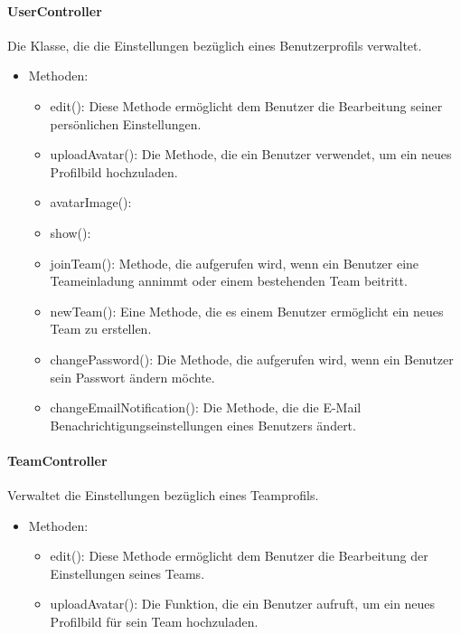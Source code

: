 	\paragraph{UserController}Die Klasse, die die Einstellungen bez\"uglich eines Benutzerprofils verwaltet.
		\begin{itemize}
			\item Methoden:
			\begin{itemize}
				\item edit(): Diese Methode erm\"oglicht dem Benutzer die Bearbeitung seiner pers\"onlichen Einstellungen.
				\item uploadAvatar(): Die Methode, die ein Benutzer verwendet, um ein neues Profilbild hochzuladen.
				\item avatarImage(): %
				\item show(): %
				\item joinTeam(): Methode, die aufgerufen wird, wenn ein Benutzer eine Teameinladung annimmt oder einem bestehenden Team beitritt.
				\item newTeam(): Eine Methode, die es einem Benutzer erm\"oglicht ein neues Team zu erstellen. %
				\item changePassword(): Die Methode, die aufgerufen wird, wenn ein Benutzer sein Passwort \"andern m\"ochte.
				\item changeEmailNotification(): Die Methode, die die E-Mail Benachrichtigungseinstellungen eines Benutzers \"andert.
			\end{itemize}
		\end{itemize}
	\paragraph{TeamController}Verwaltet die Einstellungen bez\"uglich eines Teamprofils.
		\begin{itemize}
			\item Methoden:
			\begin{itemize}
				\item edit(): Diese Methode erm\"oglicht dem Benutzer die Bearbeitung der Einstellungen seines Teams.
				\item uploadAvatar(): Die Funktion, die ein Benutzer aufruft, um ein neues Profilbild f\"ur sein Team hochzuladen.
			\end{itemize}
		\end{itemize}
